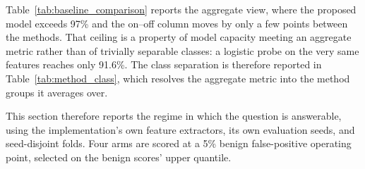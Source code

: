 \documentclass[notspecified,article,submit,moreauthors]{Definitions/mdpi}
\begin{document}
Table~\ref{tab:baseline_comparison} reports the aggregate view, where the proposed model exceeds 97\% and the on--off column moves by only a few points between the methods. That ceiling is a property of model capacity meeting an aggregate metric rather than of trivially separable classes: a logistic probe on the very same features reaches only 91.6\%. The class separation is therefore reported in Table~\ref{tab:method_class}, which resolves the aggregate metric into the method groups it averages over.

This section therefore reports the regime in which the question is answerable, using the implementation's own feature extractors, its own evaluation seeds, and seed-disjoint folds. Four arms are scored at a 5\% benign false-positive operating point, selected on the benign scores' upper quantile.

\begin{table}[!htbp]
  \centering
  \caption{Probe-level evaluation with a logistic classifier (30 UAVs, 30\% malicious, 50 evaluation seeds, seed-disjoint 5-fold). This is the regime in which the aggregate metric still discriminates. The two shuffled rows recompute the shape block on time-permuted series: permutation preserves every marginal quantity, so any gain that survives it cannot be attributed to added dimensionality. Bold marks the best value in the column.}
  \label{tab:probe_level}
  \footnotesize
  \setlength{\tabcolsep}{5pt}
  \renewcommand{\arraystretch}{1.15}
\end{table}
\end{document}

